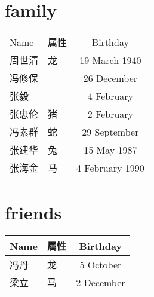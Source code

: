 \documentclass[fontset=windows]{ctexart}
\begin{document}
\section{family}
\begin{NiceTabular}{llc}
  \toprule
  Name & 属性 & Birthday \\
  周世清 & 龙 & 19 March 1940 \\
  冯修保 &  & 26 December \\
  张毅 & & 4 February \\
  张忠伦 & 猪 & 2 February \\
  冯素群 & 蛇 & 29 September \\

  张建华 & 兔 & 15 May 1987 \\
  张海金 & 马 & 4 February 1990 \\
  \midrule
  \bottomrule
\end{NiceTabular}

\section{friends}
\begin{NiceTabular}{llc}
  \toprule
  Name & 属性 & Birthday \\
  \midrule
  冯丹 & 龙 & 5 October \\
  梁立 & 马 & 2 December \\
  \bottomrule
  
\end{NiceTabular}
\end{document}
